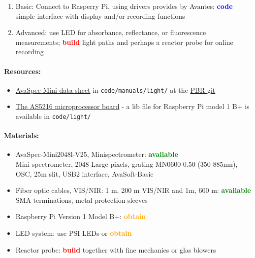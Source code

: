\documentclass[12pt,a4paper]{scrartcl}
\newcommand{\git}[0]{\href{https://git.hhu.de/machne/pbr_hackathon_201503}{PBR git}}
\newcommand{\obtain}[0]{\textcolor{orange}{\textbf{obtain}}}
\newcommand{\avail}[0]{\textcolor{green}{\textbf{available}}}
\newcommand{\build}[0]{\textcolor{red}{\textbf{build}}}
\newcommand{\code}[0]{\textcolor{blue}{\textbf{code}}}
\begin{document}
\begin{enumerate}
\item Basic: Connect to Rasperry Pi, using drivers provides by
  Avantes; \code{} simple interface with display and/or recording
  functions
\item Advanced: use LED for absorbance, reflectance, or fluorescence
  measurements; \build{} light paths and perhaps a reactor probe for
  online recording
\end{enumerate}

\paragraph{Resources:}
\begin{itemize}
\item
  \href{http://www.avantes.com/images/productsheets/AvaSpec_Mini5.pdf}{AvaSpec-Mini
    data sheet} in \texttt{code/manuals/light/} at the \git{}
\item \href{http://www.avantes.com/products/oem/item/220-oem-spectrometers-as5216-microprocessor-board}{The AS5216 microprocessor board} - a lib file for Raspberry Pi model 1 B+ is available in \texttt{code/light/}
\end{itemize}

\paragraph{Materials:}
\begin{itemize}
\item AvaSpec-Mini2048l-V25, Minispectrometer: \avail{}\\ Mini
  spectrometer, 2048 Large pixels, grating-MN0600-0.50 (350-885nm),
  OSC, 25\textmu{}m slit, USB2 interface, AvaSoft-Basic
\item Fiber optic cables, VIS/NIR: 1 m, 200 \textmu{}m VIS/NIR and 1m,
  600 \textmu{}m: \avail{}\\
  SMA terminations, metal protection sleeves
\item Raspberry Pi Version 1 Model B+: \obtain{}
\item LED system: use PSI LEDs or \obtain{}
\item Reactor probe: \build{} together with fine mechanics or glas
  blowers
\end{itemize}
\end{document}
